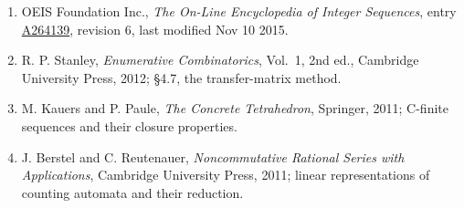 \documentclass[11pt]{article}
\theoremstyle{definition}
\begin{document}
\begin{enumerate}

\item OEIS Foundation Inc., \emph{The On-Line Encyclopedia of Integer Sequences}, entry \href{https://oeis.org/A264139}{A264139}, revision 6, last modified Nov 10 2015.

\item R. P. Stanley, \emph{Enumerative Combinatorics}, Vol.~1, 2nd ed., Cambridge University Press, 2012; \S4.7, the transfer-matrix method.

\item M. Kauers and P. Paule, \emph{The Concrete Tetrahedron}, Springer, 2011; C-finite sequences and their closure properties.

\item J. Berstel and C. Reutenauer, \emph{Noncommutative Rational Series with Applications}, Cambridge University Press, 2011; linear representations of counting automata and their reduction.

\end{enumerate}
\end{document}
